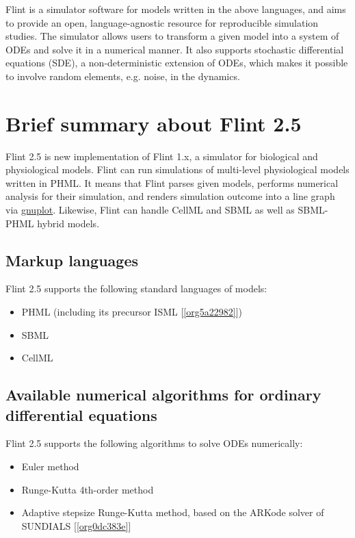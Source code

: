 \documentclass[a4paper,10pt]{report}
\begin{document}
Flint is a simulator software for models written in the above languages, and
aims to provide an open, language-agnostic resource for reproducible simulation
studies. The simulator allows users to transform a given model into a system of
ODEs and solve it in a numerical manner. It also supports stochastic
differential equations (SDE), a non-deterministic extension of ODEs, which makes
it possible to involve random elements, e.g. noise, in the dynamics.

\section{Brief summary about Flint 2.5}
\label{sec:orgf075898}
Flint 2.5 is new implementation of Flint 1.x, a simulator for biological and physiological models.
Flint can run simulations of multi-level physiological models written in PHML.
It means that Flint parses given models, performs numerical analysis for their
simulation, and renders simulation outcome into a line graph via \href{http://www.gnuplot.info/}{gnuplot}.
Likewise, Flint can handle CellML and SBML as well as SBML-PHML hybrid models.

\subsection{Markup languages}
\label{sec:org571cb75}
Flint 2.5 supports the following standard languages of models:

\begin{itemize}
\item PHML (including its precursor ISML [\ref{org5a22982}])
\item SBML
\item CellML
\end{itemize}

\subsection{Available numerical algorithms for ordinary differential equations}
\label{sec:org19a5ee0}
Flint 2.5 supports the following algorithms to solve ODEs numerically:

\begin{itemize}
\item Euler method
\item Runge-Kutta 4th-order method
\item Adaptive stepsize Runge-Kutta method, based on the ARKode solver of
SUNDIALS [\ref{org0dc383e}]
\end{itemize}
\end{document}

